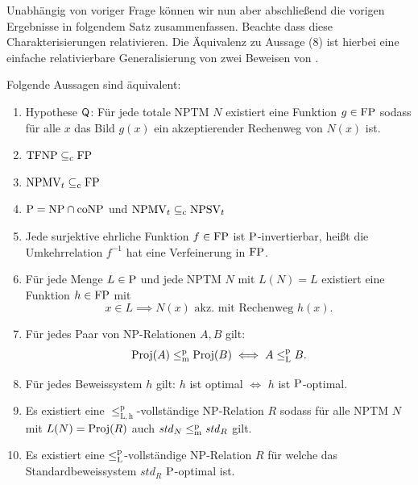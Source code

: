 Unabhängig von voriger Frage können wir nun aber abschließend die vorigen Ergebnisse in folgendem Satz zusammenfassen.
Beachte dass diese Charakterisierungen relativieren.
Die Äquivalenz zu Aussage (8) ist hierbei eine einfache relativierbare Generalisierung von zwei Beweisen von \textcite[Thm.~5.3]{messner_simulation_2001}.

\begin{theorem}\label{thm:q}
    Folgende Aussagen sind äquivalent:
    \begin{enumerate}[midpenalty=0]
        \item Hypothese $\hQ$: Für jede totale NPTM $N$  existiert eine Funktion $g\in\FP$ sodass für alle $x$ das Bild $g(x)$ ein akzeptierender Rechenweg von $N(x)$ ist.
        \item $\TFNP\subseteqc \FP$
        \item $\mathrm{NPMV}_t\subseteqc \FP$
        \item $\P=\NP\cap\coNP$ und $\mathrm{NPMV}_t\subseteqc \mathrm{NPSV}_t$
        \item Jede surjektive ehrliche Funktion $f\in\FP$ ist $\P$-invertierbar, heißt die Umkehrrelation $f^{-1}$ hat eine Verfeinerung in $\FP$. 
        \item Für jede Menge $L\in \P$  und jede NPTM $N$ mit $L(N)=L$ existiert eine Funktion $h\in \FP$ mit 
            \[ x\in L \implies N(x) \text{ akz. mit Rechenweg $h(x)$}. \]
        \item Für jedes Paar von NP-Relationen $A, B$ gilt:
            \[ \Proj(A) \leqmp \Proj(B) \iff A \leqlp B. \]
        \item Für jedes Beweissystem $h$ gilt: $h$ ist optimal $\iff$ $h$ ist $\P$-optimal. 
        \item Es existiert eine $\leq_\mathrm{L,h}^\mathrm p$-vollständige NP-Relation $R$ sodass für alle NPTM $N$ mit $L(N)=\Proj(R)$ auch $\mathit{std}_N\leqmp \mathit{std}_R$ gilt.
        \item Es existiert eine $\leqlp$-vollständige NP-Relation $R$ für welche das Standardbeweissystem $\mathit{std}_R$ $\P$-optimal ist.
    \end{enumerate}
\end{theorem}
